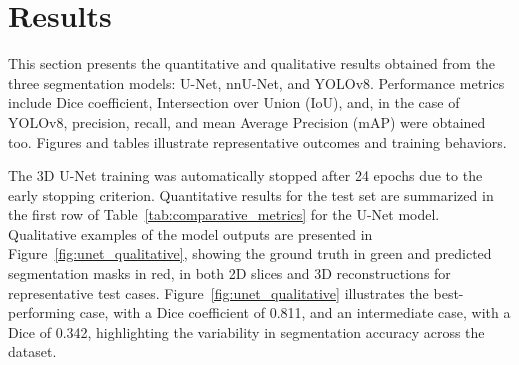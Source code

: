 \documentclass[12pt]{article}
\begin{document}



\section{Results}\label{sec:results}

This section presents the quantitative and qualitative results obtained from the three segmentation models: U-Net, nnU-Net, and YOLOv8. Performance metrics include Dice coefficient, Intersection over Union (IoU), and, in the case of YOLOv8, precision, recall, and mean Average Precision (mAP) were obtained too. Figures and tables illustrate representative outcomes and training behaviors.


The 3D U-Net training was automatically stopped after 24 epochs due to the early stopping criterion. %
Quantitative results for the test set are summarized in the first row of Table~\ref{tab:comparative_metrics} for the U-Net model.
%
Qualitative examples of the model outputs are presented in Figure~\ref{fig:unet_qualitative}, showing the ground truth in green and predicted segmentation masks in red, in both 2D slices and 3D reconstructions for representative test cases. Figure~\ref{fig:unet_qualitative} illustrates the best-performing case, with a Dice coefficient of 0.811, and an intermediate case, with a Dice of 0.342, highlighting the variability in segmentation accuracy across the dataset.
%
\end{document}

